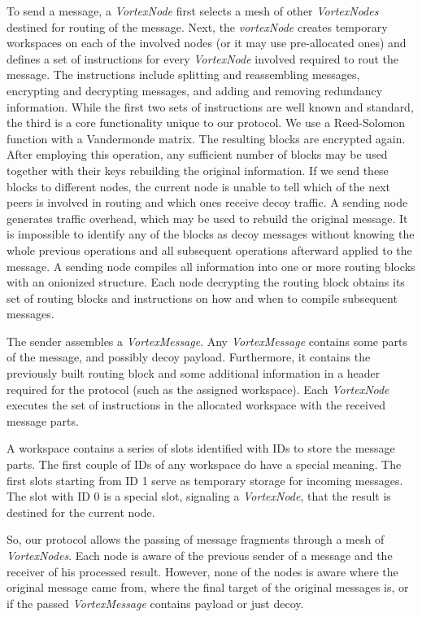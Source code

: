 \documentclass[acmsmall, screen]{acmart}
\begin{document}
To send a message, a \emph{VortexNode} first selects a mesh of other \emph{VortexNodes} destined for routing of the message. Next, the \emph{vortexNode} creates temporary workspaces on each of the involved nodes (or it may use pre-allocated ones) and defines a set of instructions for every \emph{VortexNode} involved required to rout the message. The instructions include splitting and reassembling messages, encrypting and decrypting messages, and adding and removing redundancy information. While the first two sets of instructions are well known and standard, the third is a core functionality unique to our protocol. We use a Reed-Solomon function with a Vandermonde matrix. The resulting blocks are encrypted again. After employing this operation, any sufficient number of blocks may be used together with their keys rebuilding the original information. If we send these blocks to different nodes, the current node is unable to tell which of the next peers is involved in routing and which ones receive decoy traffic. A sending node generates traffic overhead, which may be used to rebuild the original message. It is impossible to identify any of the blocks as decoy messages without knowing the whole previous operations and all subsequent operations afterward applied to the message. A sending node compiles all information into one or more routing blocks with an onionized structure. Each node decrypting the routing block obtains its set of routing blocks and instructions on how and when to compile subsequent messages. 

The sender assembles a \emph{VortexMessage}. Any \emph{VortexMessage} contains some parts of the message, and possibly decoy payload. Furthermore, it contains the previously built routing block and some additional information in a header required for the protocol (such as the assigned workspace). Each \emph{VortexNode} executes the set of instructions in the allocated workspace with the received message parts. 

A workspace contains a series of slots identified with IDs to store the message parts. The first couple of IDs of any workspace do have a special meaning. The first slots starting from ID 1 serve as temporary storage for incoming messages. The slot with ID 0 is a special slot, signaling a \emph{VortexNode}, that the result is destined for the current node.

So, our protocol allows the passing of message fragments through a mesh of \emph{VortexNodes}. Each node is aware of the previous sender of a message and the receiver of his processed result. However, none of the nodes is aware where the original message came from, where the final target of the original messages is, or if the passed \emph{VortexMessage} contains payload or just decoy. 
\end{document}
